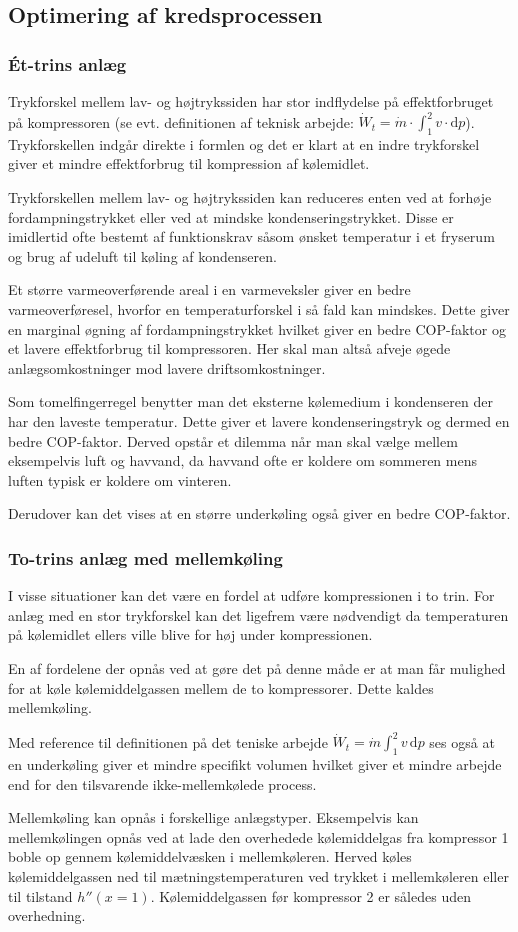 \subsection{Optimering af kredsprocessen}
\subsubsection{Ét-trins anlæg}
Trykforskel mellem lav- og højtrykssiden har stor indflydelse på effektforbruget på kompressoren (se evt. definitionen af teknisk arbejde: $\dot{W}_t = \dot{m} \cdot \int_{1}^{2} v \cdot \mathrm{d}p$). Trykforskellen indgår direkte i formlen og det er klart at en indre trykforskel giver et mindre effektforbrug til kompression af kølemidlet.

Trykforskellen mellem lav- og højtrykssiden kan reduceres enten ved at forhøje fordampningstrykket eller ved at mindske kondenseringstrykket. Disse er imidlertid ofte bestemt af funktionskrav såsom ønsket temperatur i et fryserum og brug af udeluft til køling af kondenseren.

Et større varmeoverførende areal i en varmeveksler giver en bedre varmeoverføresel, hvorfor en temperaturforskel i så fald kan mindskes. Dette giver en marginal øgning af fordampningstrykket hvilket giver en bedre COP-faktor og et lavere effektforbrug til kompressoren. Her skal man altså afveje øgede anlægsomkostninger mod lavere driftsomkostninger.

Som tomelfingerregel benytter man det eksterne kølemedium i kondenseren der har den laveste temperatur. Dette giver et lavere kondenseringstryk og dermed en bedre COP-faktor. Derved opstår et dilemma når man skal vælge mellem eksempelvis luft og havvand, da havvand ofte er koldere om sommeren mens luften typisk er koldere om vinteren.

Derudover kan det vises at en større underkøling også giver en bedre COP-faktor.

\subsubsection{To-trins anlæg med mellemkøling}
I visse situationer kan det være en fordel at udføre kompressionen i to trin. For anlæg med en stor trykforskel kan det ligefrem være nødvendigt da temperaturen på kølemidlet ellers ville blive for høj under kompressionen.

En af fordelene der opnås ved at gøre det på denne måde er at man får mulighed for at køle kølemiddelgassen mellem de to kompressorer. Dette kaldes mellemkøling.

Med reference til definitionen på det teniske arbejde $\dot{W}_t = \dot{m} \int_{1}^{2} v \, \mathrm{d}p$ ses også at en underkøling giver et mindre specifikt volumen hvilket giver et mindre arbejde end for den tilsvarende ikke-mellemkølede process.

Mellemkøling kan opnås i forskellige anlægstyper. Eksempelvis kan mellemkølingen opnås ved at lade den overhedede kølemiddelgas fra kompressor 1 boble op gennem kølemiddelvæsken i mellemkøleren. Herved køles kølemiddelgassen ned til mætningstemperaturen ved trykket i mellemkøleren eller til tilstand $h'' (x=1)$. Kølemiddelgassen før kompressor 2 er således uden overhedning.
